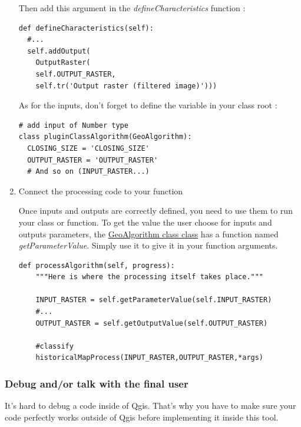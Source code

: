 \documentclass[a4paper,11pt,DIV=18]{scrartcl}
\begin{document}
\begin{enumerate}
Then add this argument in the \emph{defineCharacteristics} function :
\begin{verbatim}
def defineCharacteristics(self):
  #...
  self.addOutput(
    OutputRaster(
    self.OUTPUT_RASTER,
    self.tr('Output raster (filtered image)')))
\end{verbatim}

As for the inputs, don't forget to define the variable in your class root :
\begin{verbatim}
# add input of Number type
class pluginClassAlgorithm(GeoAlgorithm):
  CLOSING_SIZE = 'CLOSING_SIZE'
  OUTPUT_RASTER = 'OUTPUT_RASTER'
  # And so on (INPUT_RASTER...)
\end{verbatim}

\item Connect the processing code to your function
\label{sec:orgc403f99}

Once inputs and outputs are correctly defined, you need to use them to run your
class or function.
To get the value the user choose for inputs and outputs parameters, the
\href{https://github.com/qgis/QGIS/blob/master/python/plugins/processing/core/GeoAlgorithm.py\#L55}{GeoAlgorithm class class} has a function named \emph{getParameterValue}.
Simply use it to give it in your function arguments.

\begin{verbatim}
def processAlgorithm(self, progress):
    """Here is where the processing itself takes place."""

    INPUT_RASTER = self.getParameterValue(self.INPUT_RASTER)
    #...
    OUTPUT_RASTER = self.getOutputValue(self.OUTPUT_RASTER)

    #classify
    historicalMapProcess(INPUT_RASTER,OUTPUT_RASTER,*args)
\end{verbatim}
\end{enumerate}

\subsubsection{Debug and/or talk with the final user}
\label{sec:orge76a843}
It's hard to debug a code inside of Qgis. That's why you have to make sure your
code perfectly works outside of Qgis before implementing it inside this tool.
\end{document}
